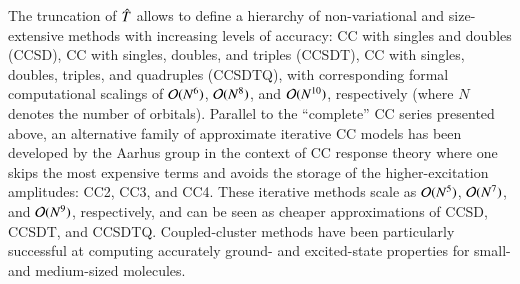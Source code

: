 \documentclass[aip,jcp,reprint,noshowkeys,superscriptaddress,floatfix]{revtex4-1}
\newcommand{\Norb}{N}
\newcommand{\hT}{\Hat{T}}
\begin{document}
The truncation of $\hT$ allows to define a hierarchy of non-variational and size-extensive methods with increasing levels of accuracy:
CC with singles and doubles (CCSD), \cite{Cizek_1966,Purvis_1982} CC with singles, doubles, and triples (CCSDT), \cite{Noga_1987a,Scuseria_1988} CC with singles, doubles, triples, and quadruples (CCSDTQ), \cite{Oliphant_1991,Kucharski_1992} with corresponding formal computational scalings of $\order*{\Norb^{6}}$, $\order*{\Norb^{8}}$, and $\order*{\Norb^{10}}$, respectively (where $\Norb$ denotes the number of orbitals).
Parallel to the ``complete'' CC series presented above, an alternative family of approximate iterative CC models has been developed by the Aarhus group in the context of CC response theory \cite{Christiansen_1998} where one skips the most expensive terms and avoids the storage of the higher-excitation amplitudes: CC2, \cite{Christiansen_1995a} CC3, \cite{Christiansen_1995b,Koch_1997} and CC4. \cite{Kallay_2005,Matthews_2021}
These iterative methods scale as $\order*{\Norb^{5}}$, $\order*{\Norb^{7}}$, and $\order*{\Norb^{9}}$, respectively, and can be seen as cheaper approximations of CCSD, CCSDT, and CCSDTQ.
Coupled-cluster methods have been particularly successful at computing accurately ground- and excited-state properties for small- and medium-sized molecules.
\cite{Kallay_2003,Kallay_2004a,Gauss_2006,Kallay_2006,Gauss_2009,Chrayteh_2021,Sarkar_2021}
\end{document}
